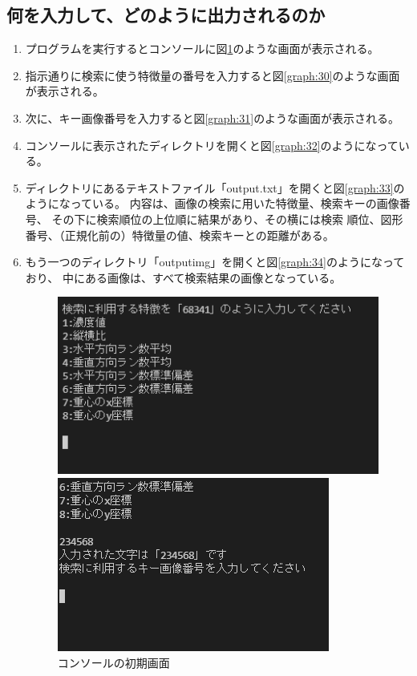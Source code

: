 \subsection{何を入力して、どのように出力されるのか}
\begin{enumerate}
  \item プログラムを実行するとコンソールに図\ref{graph:29}のような画面が表示される。
  \item 指示通りに検索に使う特徴量の番号を入力すると図\ref{graph:30}のような画面が表示される。
  \item 次に、キー画像番号を入力すると図\ref{graph:31}のような画面が表示される。
  \item コンソールに表示されたディレクトリを開くと図\ref{graph:32}のようになっている。
  \item ディレクトリにあるテキストファイル「output.txt」を開くと図\ref{graph:33}のようになっている。
  内容は、画像の検索に用いた特徴量、検索キーの画像番号、
  その下に検索順位の上位順に結果があり、その横には検索
  順位、図形番号、（正規化前の）特徴量の値、検索キーとの距離がある。
  \item もう一つのディレクトリ「outputimg」を開くと図\ref{graph:34}のようになっており、
  中にある画像は、すべて検索結果の画像となっている。
  \begin{figure}[htbp]
    \begin{minipage}[t]{0.33\hsize}
      \includegraphics[scale=0.4]{入力1.PNG}
      \centering
      \caption{コンソールの初期画面}
      \label{graph:29}
    \end{minipage}
    \begin{minipage}[t]{0.33\hsize}
      \includegraphics[scale=0.4]{入力2.PNG}

\end{minipage}
\end{figure}
\end{enumerate}
